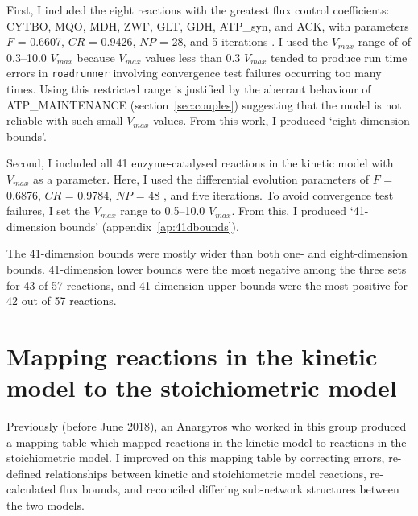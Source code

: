\documentclass[parskip=full, numbers=noenddot]{scrreprt}
\begin{document}
First, I included the eight reactions with the greatest flux control coefficients: CYTBO, MQO, MDH, ZWF, GLT, GDH, ATP\_syn, and ACK, with parameters $F$ = 0.6607, $CR$ = 0.9426, $NP$ = 28, and 5 iterations \citep{pedersen_good_2010}. I used the $V_{max}$ range of of 0.3--10.0 $V_{max}$ because $V_{max}$ values less than 0.3 $V_{max}$ tended to produce run time errors in \texttt{roadrunner} involving convergence test failures occurring too many times. Using this restricted range is justified by the aberrant behaviour of ATP\_MAINTENANCE (section~\ref{sec:couples}) suggesting that the model is not reliable with such small $V_{max}$ values. From this work, I produced `eight-dimension bounds'.

Second, I included all 41 enzyme-catalysed reactions in the kinetic model with $V_{max}$ as a parameter. Here, I used the differential evolution parameters of $F$ = 0.6876, $CR$ = 0.9784, $NP$ = 48 \citep{pedersen_good_2010}, and five iterations. To avoid convergence test failures, I set the $V_{max}$ range to 0.5--10.0 $V_{max}$. From this, I produced `41-dimension bounds' (appendix~\ref{ap:41dbounds}).

The 41-dimension bounds were mostly wider than both one- and eight-dimension bounds. 41-dimension lower bounds were the most negative among the three sets for 43 of 57 reactions, and 41-dimension upper bounds were the most positive for 42 out of 57 reactions.

\section{Mapping reactions in the kinetic model to the stoichiometric model}
\label{sec:mapping}


Previously (before June 2018), an Anargyros who worked in this group produced a mapping table which mapped reactions in the kinetic model to reactions in the stoichiometric model. %
I improved on this mapping table by correcting errors, re-defined relationships between kinetic and stoichiometric model reactions, re-calculated flux bounds, and reconciled differing sub-network structures between the two models.
\end{document}
